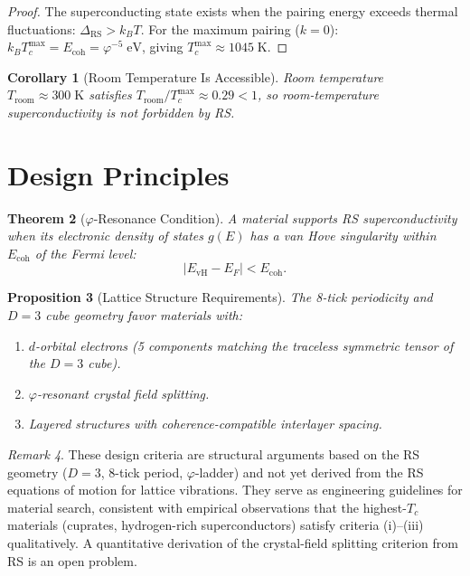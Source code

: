 \documentclass[12pt,a4paper]{article}
\newtheorem{theorem}{Theorem}[section]
\newtheorem{corollary}[theorem]{Corollary}
\newtheorem{proposition}[theorem]{Proposition}
\theoremstyle{definition}
\theoremstyle{remark}
\newtheorem{remark}[theorem]{Remark}
\begin{document}
\begin{proof}
The superconducting state exists when the pairing energy exceeds
thermal fluctuations: $\Delta_{\mathrm{RS}} > k_B T$.  For the
maximum pairing ($k = 0$):
$k_B T_c^{\max} = E_{\mathrm{coh}} = \varphi^{-5}\;\mathrm{eV}$,
giving $T_c^{\max} \approx 1045\;\mathrm{K}$.
\end{proof}

\begin{corollary}[Room Temperature Is Accessible]
Room temperature $T_{\mathrm{room}} \approx 300\;\mathrm{K}$
satisfies $T_{\mathrm{room}}/T_c^{\max} \approx 0.29 < 1$, so
room-temperature superconductivity is not forbidden by RS.
\end{corollary}

\section{Design Principles}
\label{sec:design}

\begin{theorem}[$\varphi$-Resonance Condition]
\label{thm:resonance}
A material supports RS superconductivity when its electronic
density of states $g(E)$ has a van Hove singularity within
$E_{\mathrm{coh}}$ of the Fermi level:
\begin{equation}
  |E_{\mathrm{vH}} - E_F| < E_{\mathrm{coh}}.
\end{equation}
\end{theorem}

\begin{proposition}[Lattice Structure Requirements]
\label{prop:lattice}
The 8-tick periodicity and $D = 3$ cube geometry favor materials
with:
\begin{enumerate}[label=(\roman*)]
  \item $d$-orbital electrons (5 components matching the traceless
  symmetric tensor of the $D = 3$ cube).
  \item $\varphi$-resonant crystal field splitting.
  \item Layered structures with coherence-compatible interlayer
  spacing.
\end{enumerate}
\end{proposition}

\begin{remark}
These design criteria are structural arguments based on the RS
geometry ($D=3$, 8-tick period, $\varphi$-ladder) and not yet
derived from the RS equations of motion for lattice vibrations.
They serve as engineering guidelines for material search, consistent
with empirical observations that the highest-$T_c$ materials
(cuprates, hydrogen-rich superconductors) satisfy criteria (i)--(iii)
qualitatively.  A quantitative derivation of the crystal-field
splitting criterion from RS is an open problem.
\end{remark}
\end{document}
